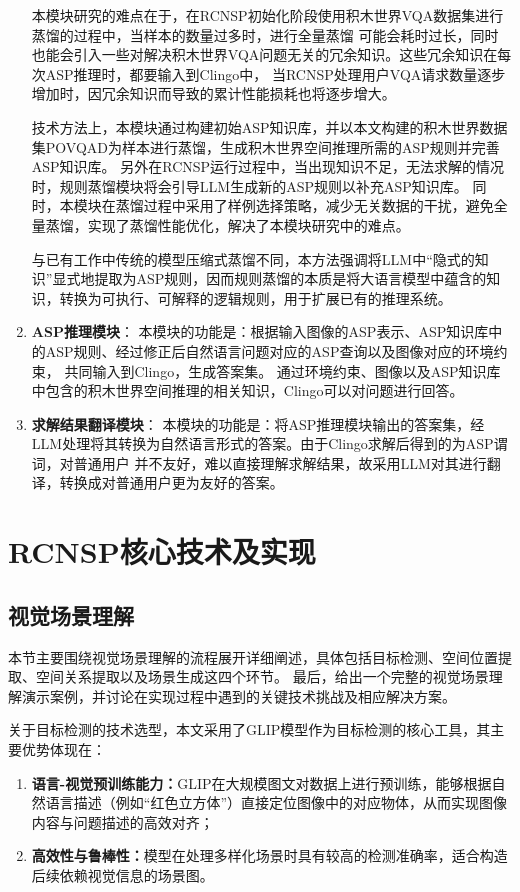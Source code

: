\begin{enumerate}[nosep]
本模块研究的难点在于，在RCNSP初始化阶段使用积木世界VQA数据集进行蒸馏的过程中，当样本的数量过多时，进行全量蒸馏
可能会耗时过长，同时也能会引入一些对解决积木世界VQA问题无关的冗余知识。这些冗余知识在每次ASP推理时，都要输入到Clingo中，
当RCNSP处理用户VQA请求数量逐步增加时，因冗余知识而导致的累计性能损耗也将逐步增大。

技术方法上，本模块通过构建初始ASP知识库，并以本文构建的积木世界数据集POVQ\-AD为样本进行蒸馏，生成积木世界空间推理所需的ASP规则并完善ASP知识库。
另外在RCNSP运行过程中，当出现知识不足，无法求解的情况时，规则蒸馏模块将会引导LLM生成新的ASP规则以补充ASP知识库。
同时，本模块在蒸馏过程中采用了样例选择策略，减少无关数据的干扰，避免全量蒸馏，实现了蒸馏性能优化，解决了本模块研究中的难点。

与已有工作中传统的模型压缩式蒸馏不同，本方法强调将LLM中“隐式的知识”显式地提取为ASP规则，因而规则蒸馏的本质是将大语言模型中蕴含的知识，转换为可执行、可解释的逻辑规则，用于扩展已有的推理系统。
\item \textbf{ASP推理模块}：
本模块的功能是：根据输入图像的ASP表示、ASP知识库中的ASP规则、经过修正后自然语言问题对应的ASP查询以及图像对应的环境约束，
共同输入到Clingo，生成答案集。
通过环境约束、图像以及ASP知识库中包含的积木世界空间推理的相关知识，Clingo可以对问题进行回答。
\item \textbf{求解结果翻译模块}：
本模块的功能是：将ASP推理模块输出的答案集，经LLM处理将其转换为自然语言形式的答案。由于Clingo求解后得到的为ASP谓词，对普通用户
并不友好，难以直接理解求解结果，故采用LLM对其进行翻译，转换成对普通用户更为友好的答案。
\end{enumerate}
\section{RCNSP核心技术及实现}
\subsection{视觉场景理解}
本节主要围绕视觉场景理解的流程展开详细阐述，具体包括目标检测、空间位置提取、空间关系提取以及场景生成这四个环节。
最后，给出一个完整的视觉场景理解演示案例，并讨论在实现过程中遇到的关键技术挑战及相应解决方案。

关于目标检测的技术选型，本文采用了GLIP模型作为目标检测的核心工具，其主要优势体现在：
\begin{enumerate}[nosep] 
\item \textbf{语言-视觉预训练能力：}GLIP在大规模图文对数据上进行预训练，能够根据自然语言描述（例如“红色立方体”）直接定位图像中的对应物体，从而实现图像内容与问题描述的高效对齐； 
\item \textbf{高效性与鲁棒性：}模型在处理多样化场景时具有较高的检测准确率，适合构造后续依赖视觉信息的场景图。 
\end{enumerate}

